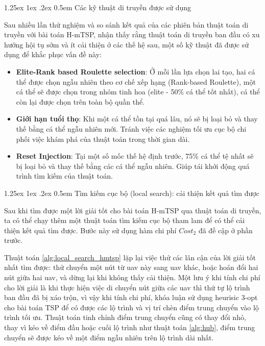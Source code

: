 \documentclass[a4paper]{article}
\makeatletter
\renewcommand{\paragraph}{%
  \@startsection{paragraph}{4}{\z@}%
  {1.25ex \@plus 1ex \@minus .2ex}%
  {0.5em}%
  {\normalfont\normalsize\bfseries}%
}
\makeatother
\begin{document}
\paragraph{Các kỹ thuật di truyền được sử dụng}

Sau nhiều lần thử nghiệm và so sánh kết quả của các phiên bản thuật toán di truyền với bài toán H-mTSP, nhận thấy rằng thuật toán di truyền ban đầu có xu hướng hội tụ sớm và ít cải thiện ở các thế hệ sau, một số kỹ thuật đã được sử dụng để khắc phục vấn đề này:

\begin{itemize}
  \item \textbf{Elite-Rank based Roulette selection}: Ở mỗi lần lựa chọn lai tạo, hai cá thể được chọn ngẫu nhiên theo cơ chế xếp hạng (Rank-based Roulette), một cá thể sẽ được chọn trong nhóm tinh hoa (elite - 50\% cá thể tốt nhất), cá thể còn lại được chọn trên toàn bộ quần thể.
  \item \textbf{Giới hạn tuổi thọ}: Khi một cá thể tồn tại quá lâu, nó sẽ bị loại bỏ và thay thế bằng cá thể ngẫu nhiên mới. Tránh việc các nghiệm tối ưu cục bộ chi phối việc khám phá của thuật toán trong thời gian dài.
  \item \textbf{Reset Injection}: Tại một số mốc thế hệ định trước, 75\% cá thể tệ nhất sẽ bị loại bỏ và thay thế bằng các cá thể ngẫu nhiên. Giúp tái khởi động quá trình tìm kiếm của thuật toán.

\end{itemize}

\paragraph{Tìm kiếm cục bộ (local search): cải thiện kết quả tìm được}

Sau khi tìm được một lời giải tốt cho bài toán H-mTSP qua thuật toán di truyền, ta có thể chạy thêm một thuật toán tìm kiếm cục bộ tham lam để có thể cải thiện kết quả tìm được. Bước này sử dụng hàm chi phí $Cost_2$ đã đề cập ở phần trước.

Thuật toán \ref{alg:local_search_hmtsp} lặp lại việc thử các lân cận của lời giải tốt nhất tìm được: thử chuyển một nút từ uav này sang uav khác, hoặc hoán đổi hai nút giữa hai uav, và dừng lại khi không thấy cải thiện. Một lưu ý khi tính chi phí cho lời giải là khi thực hiện việc di chuyển nút giữa các uav thì thứ tự lộ trình ban đầu đã bị xáo trộn, vì vậy khi tính chi phí, khóa luận sử dụng heurisic 3-opt cho bài toán TSP để có được các lộ trình và vị trí chèn điểm trung chuyển vào lộ trình tối ưu. Thuật toán tinh chỉnh điểm trung chuyển cũng có thay đổi nhỏ, thay vì kéo về điểm đầu hoặc cuối lộ trình như thuật toán \ref{alg:hub}, điểm trung chuyển sẽ được kéo về một điểm ngẫu nhiên trên lộ trình dài nhất.
\end{document}
